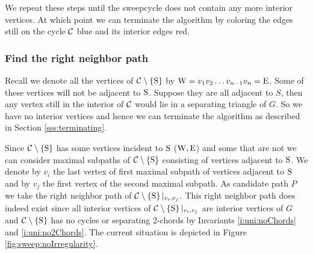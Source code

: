 We repeat these steps until the sweepcycle does not contain any more interior vertices. At which point we can terminate the algorithm by coloring the edges still on the cycle $\mathcal{C}$ blue and its interior edges red.

\subsubsection{Find the right neighbor path}
  Recall we denote all the vertices of $\mathcal{C} \setminus \left\lbrace {\mathrm{S}} \right\rbrace$ by $\mathrm{W} =  v_1   v_2   \ldots v_{n-1}   v_n = \mathrm{E}$.
  Some of these vertices will not be adjacent to $\mathrm{S}$.
  Suppose they are all adjacent to $S$, then any vertex still in the interior of $\mathcal{C}$ would lie in a separating triangle of $G$. So we have no interior vertices and hence we can terminate the algorithm as described in Section \ref{sss:terminating}.

  Since $\mathcal{C} \setminus \left\lbrace {\mathrm{S}} \right\rbrace$ has some vertices incident to $\mathrm{S}$ ($\mathrm{W} , \mathrm{E}$) and some that are not we can consider maximal subpaths of $\mathcal{C} \setminus \left\lbrace {\mathrm{S}} \right\rbrace$ consisting of vertices adjacent to $\mathrm{S}$.
  We denote by $v_i$ the last vertex of first maximal subpath of vertices adjacent to $\mathrm{S}$ and by $v_j$ the first vertex of the second maximal subpath.
  As candidate path $P$ we take the right neighbor path of $\mathcal{C} \setminus \left\lbrace {\mathrm{S}} \right\rbrace|_{v_i, v_j}$. This right neighbor path does indeed exist since all interior vertices of $\mathcal{C} \setminus \left\lbrace {\mathrm{S}} \right\rbrace|_{v_i, v_j}$ are interior vertices of $G$ and $\mathcal{C} \setminus \left\lbrace {\mathrm{S}} \right\rbrace$ has no cycles or separating 2-chords by Invariants \ref{i:uni:noChords} and \ref{i:uni:no2Chords}.
  The current situation is depicted in Figure \ref{fig:sweep:noIrregularity}.

